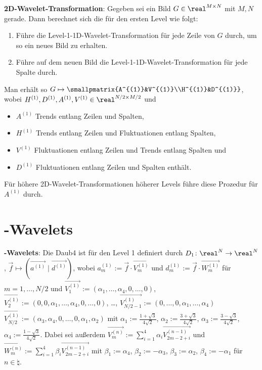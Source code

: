 \textbf{2D-Wavelet-Transformation}:
Gegeben sei ein Bild $G \in \real^{M \times N}$ mit $M, N$ gerade.
Dann berechnet sich die  für den ersten Level wie folgt:
\begin{enumerate}
    \item
    Führe die Level-1-1D-Wavelet-Transformation für jede Zeile von $G$ durch,
    um so ein neues Bild zu erhalten.

    \item
    Führe auf dem neuen Bild die Level-1-1D-Wavelet-Transformation für jede Spalte durch.
\end{enumerate}
Man erhält so $G \mapsto \smallpmatrix{A^{(1)}&V^{(1)}\\H^{(1)}&D^{(1)}}$,
wobei $H^{(1)}, D^{(1)}, A^{(1)}, V^{(1)} \in \real^{N/2 \times M/2}$ und
\begin{itemize}
    \item
    $A^{(1)}$ Trends entlang Zeilen und Spalten,

    \item
    $H^{(1)}$ Trends entlang Zeilen und Fluktuationen entlang Spalten,

    \item
    $V^{(1)}$ Fluktuationen entlang Zeilen und Trends entlang Spalten und

    \item
    $D^{(1)}$ Fluktuationen entlang Zeilen und Spalten enthält.
\end{itemize}
Für höhere 2D-Wavelet-Transformationen höherer Levels führe diese Prozedur für $A^{(1)}$ durch.

\section{%
    -Wavelets%
}

\textbf{-Wavelets}:
Die  Daub4 ist für den Level 1 definiert durch
$D_1\colon \real^N \to \real^N$, $\vec{f} \mapsto (\vec{a^{(1)}} \;|\; \vec{d^{(1)}})$,
wobei $a_m^{(1)} := \vec{f} \cdot \vec{V_m^{(1)}}$ und $d_m^{(1)} := \vec{f} \cdot \vec{W_m^{(1)}}$
für $m = 1, \dotsc, N/2$ und
$\vec{V_1^{(1)}} := (\alpha_1, \dotsc, \alpha_4, 0, \dotsc, 0)$,
$\vec{V_2^{(1)}} := (0, 0, \alpha_1, \dotsc, \alpha_4, 0, \dotsc, 0)$,
\dots,
$\vec{V_{N/2-1}^{(1)}} := (0, \dotsc, 0, \alpha_1, \dotsc, \alpha_4)$
$\vec{V_{N/2}^{(1)}} := (\alpha_3, \alpha_4, 0, \dotsc, 0, \alpha_1, \alpha_2)$
mit
$\alpha_1 := \frac{1 + \sqrt{3}}{4\sqrt{2}}$,
$\alpha_2 := \frac{3 + \sqrt{3}}{4\sqrt{2}}$,
$\alpha_3 := \frac{3 - \sqrt{3}}{4\sqrt{2}}$,
$\alpha_4 := \frac{1 - \sqrt{3}}{4\sqrt{2}}$.
Dabei sei außerdem
$\vec{V_m^{(n)}} := \sum_{i=1}^{4} \alpha_i \vec{V_{2m-2+i}^{(n-1)}}$ und\\
$\vec{W_m^{(n)}} := \sum_{i=1}^{4} \beta_i \vec{V_{2m-2+i}^{(n-1)}}$
mit
$\beta_1 := \alpha_4$,
$\beta_2 := -\alpha_3$,
$\beta_3 := \alpha_2$,
$\beta_4 := -\alpha_1$
für $n \in \natural$.

